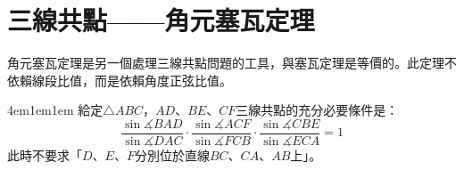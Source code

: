 \documentclass[12pt]{article}
\newif\ifshow
\begin{document}
\section{三線共點——角元塞瓦定理}
角元塞瓦定理是另一個處理三線共點問題的工具，與塞瓦定理是等價的。此定理不依賴線段比值，而是依賴角度正弦比值。
\begin{mybox}[定理]{4em}{1em}{1em}
    給定$\triangle{ABC}$，$AD$、$BE$、$CF$三線共點的充分必要條件是：
    \begin{equation*}
        \frac{\sin{\measuredangle{BAD}}}{\sin{\measuredangle{DAC}}}
        \cdot\frac{\sin{\measuredangle{ACF}}}{\sin{\measuredangle{FCB}}}
        \cdot\frac{\sin{\measuredangle{CBE}}}{\sin{\measuredangle{ECA}}} = 1
    \end{equation*}
    此時不要求「$D$、$E$、$F$分別位於直線$BC$、$CA$、$AB$上」。
\end{mybox}
\ifshow
\end{document}
